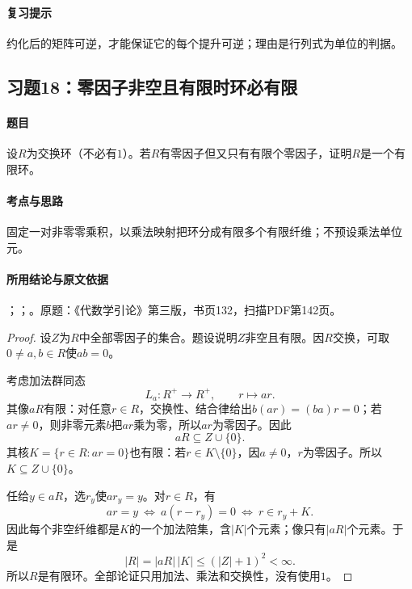 \paragraph{复习提示}

约化后的矩阵可逆，才能保证它的每个提升可逆；理由是行列式为单位的判据。



\subsection{习题18：零因子非空且有限时环必有限}

\label{ex:3:18}

\paragraph{题目}

设$R$为交换环（不必有$1$）。若$R$有零因子但又只有有限个零因子，证明$R$是一个有限环。

\paragraph{考点与思路}

固定一对非零零乘积，以乘法映射把环分成有限多个有限纤维；不预设乘法单位元。

\paragraph{所用结论与原文依据}

；；。原题：《代数学引论》第三版，书页132，扫描PDF第142页。


\begin{proof}

设$Z$为$R$中全部零因子的集合。题设说明$Z$非空且有限。因$R$交换，可取$0\ne a,b\in R$使$ab=0$。

考虑加法群同态
\[
L_a:R^+\longrightarrow R^+,\qquad r\longmapsto ar.
\]
其像$aR$有限：对任意$r\in R$，交换性、结合律给出$b(ar)=(ba)r=0$；若$ar\ne0$，则非零元素$b$把$ar$乘为零，所以$ar$为零因子。因此
\[
aR\subseteq Z\cup\{0\}.
\]
其核$K=\{r\in R:ar=0\}$也有限：若$r\in K\setminus\{0\}$，因$a\ne0$，$r$为零因子。所以$K\subseteq Z\cup\{0\}$。

任给$y\in aR$，选$r_y$使$ar_y=y$。对$r\in R$，有
\[
ar=y\ \Longleftrightarrow\ a(r-r_y)=0\ \Longleftrightarrow\ r\in r_y+K.
\]
因此每个非空纤维都是$K$的一个加法陪集，含$|K|$个元素；像只有$|aR|$个元素。于是
\[
|R|=|aR|\,|K|\le(|Z|+1)^2<\infty.
\]
所以$R$是有限环。全部论证只用加法、乘法和交换性，没有使用$1$。

\end{proof}

